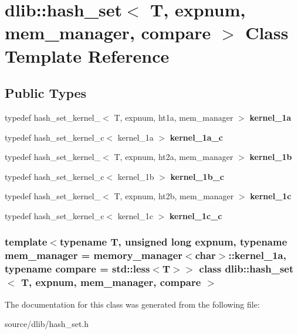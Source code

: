\hypertarget{classdlib_1_1hash__set}{
\section{dlib::hash\_\-set$<$ T, expnum, mem\_\-manager, compare $>$ Class Template Reference}
\label{classdlib_1_1hash__set}
}
\subsection*{Public Types}
\begin{DoxyCompactItemize}
\item 
\hypertarget{classdlib_1_1hash__set_af32d637e3ba29443f7099ac6b274752b}{
typedef hash\_\-set\_\-kernel\_$<$ T, expnum, ht1a, mem\_\-manager $>$ {\bfseries kernel\_\-1a}}
\label{classdlib_1_1hash__set_af32d637e3ba29443f7099ac6b274752b}

\item 
\hypertarget{classdlib_1_1hash__set_a9f0e1de66982153d9c6a965fd911b0b5}{
typedef hash\_\-set\_\-kernel\_\-c$<$ kernel\_\-1a $>$ {\bfseries kernel\_\-1a\_\-c}}
\label{classdlib_1_1hash__set_a9f0e1de66982153d9c6a965fd911b0b5}

\item 
\hypertarget{classdlib_1_1hash__set_a828ff72e182e795aef43c5e3bbfb0609}{
typedef hash\_\-set\_\-kernel\_$<$ T, expnum, ht2a, mem\_\-manager $>$ {\bfseries kernel\_\-1b}}
\label{classdlib_1_1hash__set_a828ff72e182e795aef43c5e3bbfb0609}

\item 
\hypertarget{classdlib_1_1hash__set_a7e63a3bbbb6238a5f8eac7608536078d}{
typedef hash\_\-set\_\-kernel\_\-c$<$ kernel\_\-1b $>$ {\bfseries kernel\_\-1b\_\-c}}
\label{classdlib_1_1hash__set_a7e63a3bbbb6238a5f8eac7608536078d}

\item 
\hypertarget{classdlib_1_1hash__set_a2d1375e7e537a0ecd2747d7e957ec8fa}{
typedef hash\_\-set\_\-kernel\_$<$ T, expnum, ht2b, mem\_\-manager $>$ {\bfseries kernel\_\-1c}}
\label{classdlib_1_1hash__set_a2d1375e7e537a0ecd2747d7e957ec8fa}

\item 
\hypertarget{classdlib_1_1hash__set_a608c13e45f2a82f2579ce60ebc5bf86e}{
typedef hash\_\-set\_\-kernel\_\-c$<$ kernel\_\-1c $>$ {\bfseries kernel\_\-1c\_\-c}}
\label{classdlib_1_1hash__set_a608c13e45f2a82f2579ce60ebc5bf86e}

\end{DoxyCompactItemize}
\subsubsection*{template$<$typename T, unsigned long expnum, typename mem\_\-manager = memory\_\-manager$<$char$>$::kernel\_\-1a, typename compare = std::less$<$T$>$$>$ class dlib::hash\_\-set$<$ T, expnum, mem\_\-manager, compare $>$}



The documentation for this class was generated from the following file:\begin{DoxyCompactItemize}
\item 
source/dlib/hash\_\-set.h\end{DoxyCompactItemize}
